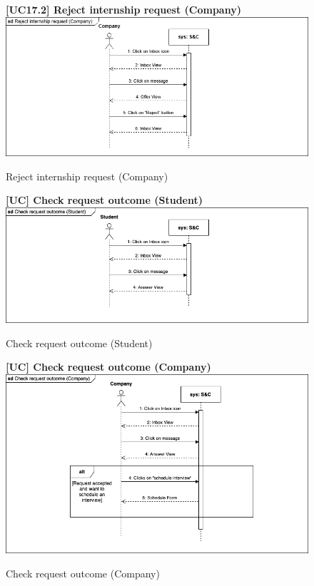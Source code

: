 \begin{figure}[H]
\textbf{[UC17.2] Reject internship request (Company)}\newline\newline
\includegraphics[width=15cm]{Images/UC_diagram/RASD-UC17.drawio.png}
    \caption{Reject internship request (Company)}
\end{figure}

\begin{figure}[H]
\textbf{[UC\nextUCDiagr] Check request outcome (Student)}\newline\newline
\includegraphics[width=15cm]{Images/UC_diagram/RASD-UC_CheckRequestOutcome(S).png}
    \caption{Check request outcome (Student)}
\end{figure}

\begin{figure}[H]
\textbf{[UC\nextUCDiagr] Check request outcome (Company)}\newline\newline
\includegraphics[width=15cm]{Images/UC_diagram/RASD-UC_CheckRequestOutcome(C).png}
    \caption{Check request outcome (Company)}
\end{figure}


